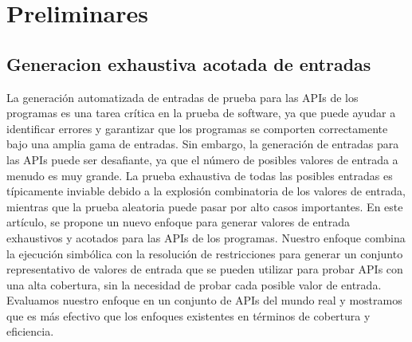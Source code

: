 \chapter[Preliminares]{Preliminares}
\label{cap:preliminares.BE}
\section{Generacion exhaustiva acotada  de entradas}
\label{sec:BE}
La generación automatizada de entradas de prueba para las APIs de los programas es una tarea crítica en la prueba de software, ya que puede ayudar a identificar errores y garantizar que los programas se comporten correctamente bajo una amplia gama de entradas. Sin embargo, la generación de entradas para las APIs puede ser desafiante, ya que el número de posibles valores de entrada a menudo es muy grande. La prueba exhaustiva de todas las posibles entradas es típicamente inviable debido a la explosión combinatoria de los valores de entrada, mientras que la prueba aleatoria puede pasar por alto casos importantes. En este artículo, se propone un nuevo enfoque para generar valores de entrada exhaustivos y acotados para las APIs de los programas. Nuestro enfoque combina la ejecución simbólica con la resolución de restricciones para generar un conjunto representativo de valores de entrada que se pueden utilizar para probar APIs con una alta cobertura, sin la necesidad de probar cada posible valor de entrada. Evaluamos nuestro enfoque en un conjunto de APIs del mundo real y mostramos que es más efectivo que los enfoques existentes en términos de cobertura y eficiencia.

